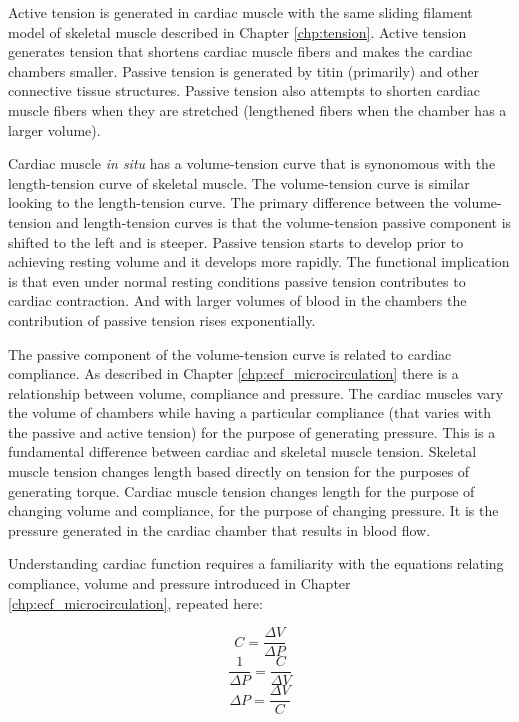 Active tension is generated in cardiac muscle with the same sliding filament model of skeletal muscle described in Chapter \ref{chp:tension}. Active tension generates tension that shortens cardiac muscle fibers and makes the cardiac chambers smaller. Passive tension is generated by titin (primarily) and other connective tissue structures. Passive tension also attempts to shorten cardiac muscle fibers when they are stretched (lengthened fibers when the chamber has a larger volume). 

Cardiac muscle \textit{in situ} has a volume-tension curve that is synonomous with the length-tension curve of skeletal muscle. The volume-tension curve is similar looking to the length-tension curve. The primary difference between the volume-tension and length-tension curves is that the volume-tension passive component is shifted to the left and is steeper. Passive tension starts to develop prior to achieving resting volume and it develops more rapidly. The functional implication is that even under normal resting conditions passive tension contributes to cardiac contraction. And with larger volumes of blood in the chambers the contribution of passive tension rises exponentially.

The passive component of the volume-tension curve is related to cardiac compliance. As described in Chapter \ref{chp:ecf_microcirculation} there is a relationship between volume, compliance and pressure. The cardiac muscles vary the volume of chambers while having a particular compliance (that varies with the passive and active tension) for the purpose of generating pressure. This is a fundamental difference between cardiac and skeletal muscle tension. Skeletal muscle tension changes length based directly on tension for the purposes of generating torque. Cardiac muscle tension changes length for the purpose of changing volume and compliance, for the purpose of changing pressure. It is the pressure generated in the cardiac chamber that results in blood flow.

Understanding cardiac function requires a familiarity with the equations relating compliance, volume and pressure introduced in Chapter \ref{chp:ecf_microcirculation}, repeated here:


\begin{equation}
    C = \frac{\Delta V}{\Delta P}
    \label{Cardiac_Compliance}
\end{equation}
\begin{equation}
    \frac{1}{\Delta P} = \frac{C}{\Delta V}
    \label{Cardiac_InversePressure}
\end{equation}
\begin{equation}
    \Delta P = \frac{\Delta V}{C}
    \label{Cardiac_Pressure}
\end{equation}

